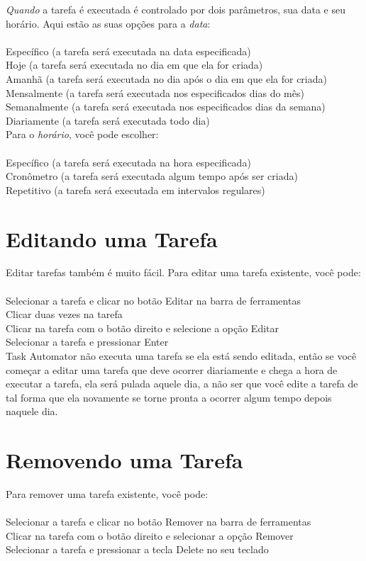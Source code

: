 \documentclass{article}
\begin{document}
\emph{Quando} a tarefa é executada é controlado por dois parâmetros, sua data e seu horário. Aqui estão as suas opções para a \emph{data}:\\
\\
Específico (a tarefa será executada na data especificada)\\
Hoje (a tarefa será executada no dia em que ela for criada)\\
Amanhã (a tarefa será executada no dia após o dia em que ela for criada)\\
Mensalmente (a tarefa será executada nos especificados dias do mês)\\
Semanalmente (a tarefa será executada nos especificados dias da semana)\\
Diariamente (a tarefa será executada todo dia)\\

Para o \emph{horário}, você pode escolher:\\
\\
Específico (a tarefa será executada na hora especificada)\\
Cronômetro (a tarefa será executada algum tempo após ser criada)\\
Repetitivo (a tarefa será executada em intervalos regulares)\\

\section{Editando uma Tarefa}
Editar tarefas também é muito fácil. Para editar uma tarefa existente, você pode:\\
\\
Selecionar a tarefa e clicar no botão Editar na barra de ferramentas\\
Clicar duas vezes na tarefa\\
Clicar na tarefa com o botão direito e selecione a opção Editar\\
Selecionar a tarefa e pressionar Enter\\

Task Automator não executa uma tarefa se ela está sendo editada, então se você começar a editar uma tarefa que deve ocorrer diariamente e chega a hora de executar a tarefa, ela será pulada aquele dia, a não ser que você edite a tarefa de tal forma que ela novamente se torne pronta a ocorrer algum tempo depois naquele dia.

\section{Removendo uma Tarefa}
Para remover uma tarefa existente, você pode:\\
\\
Selecionar a tarefa e clicar no botão Remover na barra de ferramentas\\
Clicar na tarefa com o botão direito e selecionar a opção Remover\\
Selecionar a tarefa e pressionar a tecla Delete no seu teclado
\pagebreak
\end{document}
